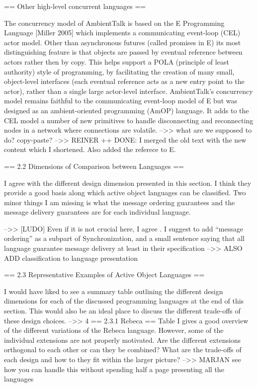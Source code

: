 \documentclass{article}
\begin{document}
== Other high-level concurrent languages ==

The concurrency model of AmbientTalk is based on the E Programming Language [Miller 2005] 
which implements a communicating event-loop (CEL) actor model. Other than asynchronous 
futures (called promises in E) its most distinguishing feature is that objects are passed 
by eventual reference between actors rather then by copy. This helps support a POLA 
(principle of least authority) style of programming, by facilitating the creation of many 
small, object-level interfaces (each eventual reference acts as a new entry point to the 
actor), rather than a single large actor-level interface. AmbientTalk's concurrency model 
remains faithful to the communicating event-loop model of E but was designed as an 
ambient-oriented programming (AmOP) language. It adds to the CEL model a number of new 
primitives to handle disconnecting and reconnecting nodes in a network where connections 
are volatile.
-->> what are we supposed to do? copy-paste?
-->> REINER
++ DONE: I merged the old text with the new content which I shortened. Also added the 
referece to E.

== 2.2 Dimensions of Comparison between Languages ==

I agree with the different design dimension presented in this section. I think they 
provide a good basis along which active object languages can be classified. Two minor 
things I am missing is what the message ordering guarantees and the message delivery 
guarantees are for each individual language.

-->> [LUDO] Even if it is not crucial here, I agree . I suggest to add “message ordering” 
as a subpart of Synchronization, and a small sentence saying that all language guarantee 
message delivery at least in their specification
-->> ALSO ADD classification to language presentation

== 2.3 Representative Examples of Active Object Languages ==

I would have liked to see a summary table outlining the different design dimensions for 
each of the discussed programming languages at the end of this section. This would also 
be an ideal place to discuss the different trade-offs of these design choices.
-->> {4}
== 2.3.1 Rebeca ==
Table I gives a good overview of the different variations of the Rebeca language. 
However, some of the individual extensions are not properly motivated. Are the different 
extensions orthogonal to each other or can they be combined? What are the trade-offs of 
each design and how to they fit within the larger picture?
-->> MARJAN see how you can handle this without spending half a page presenting all the 
languages
\end{document}

